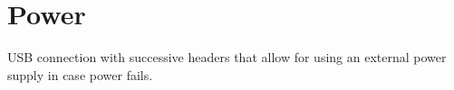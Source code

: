 \section{Power}
USB connection with successive headers that allow for using an external power supply in case power fails.
